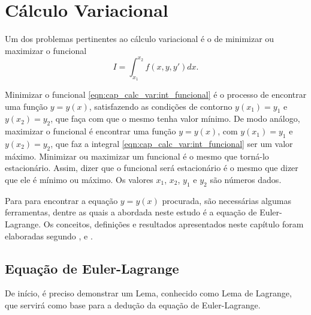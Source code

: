 \documentclass[
	12pt,				%
	openright,			%
    twoside,			%
	a4paper,			%
	english,			%
	french,				%
	spanish,			%
	brazil				%
	]{abntex2}
\numberwithin{lema}{chapter}
\numberwithin{teorema}{chapter}
\numberwithin{definicao}{chapter}
\numberwithin{exemplo}{chapter}
\numberwithin{figure}{chapter}
\begin{document}
\chapter{Cálculo Variacional}
\label{cap:calc_var}

Um dos problemas pertinentes ao cálculo variacional é o de minimizar ou maximizar o funcional
\begin{equation}
	\label{eqn:cap_calc_var:int_funcional}
	I = \int_{x_1}^{x_2} f(x,y,y')dx\text{.}
\end{equation}

Minimizar o funcional \eqref{eqn:cap_calc_var:int_funcional} é o processo de encontrar uma função $y=y(x)$, satisfazendo as condições de contorno $y(x_1)=y_1$ e $y(x_2)=y_2$,  que faça com que o mesmo tenha valor mínimo. De modo análogo, maximizar o funcional é encontrar uma função $y=y(x)$, com $y(x_1)=y_1$ e $y(x_2)=y_2$, que faz a integral \eqref{eqn:cap_calc_var:int_funcional} ser um valor máximo. Minimizar ou maximizar um funcional é o mesmo que torná-lo estacionário. Assim, dizer que o funcional será estacionário é o mesmo que dizer que ele é mínimo ou máximo. Os valores $x_1$, $x_2$, $y_1$ e $y_2$ são números dados.


Para para encontrar a equação $y=y(x)$ procurada, são necessárias algumas ferramentas, dentre as quais a abordada neste estudo é a equação de Euler-Lagrange. Os conceitos, definições e resultados apresentados neste capítulo foram elaboradas segundo ,  e .

\section{Equação de Euler-Lagrange}
\label{sec:eq_euler_lagrange}

De início, é preciso demonstrar um Lema, conhecido como Lema de Lagrange, que servirá como base para a dedução da equação de Euler-Lagrange.
\end{document}
